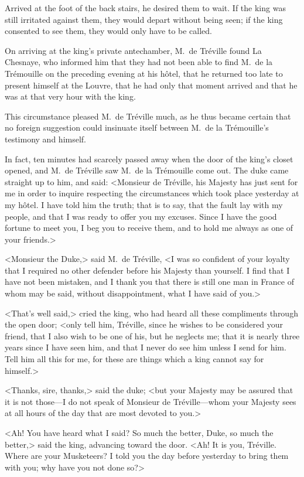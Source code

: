 Arrived at the foot of the back stairs, he desired them to wait. If the king was still irritated against them, they would depart without being seen; if the king consented to see them, they would only have to be called. 

On arriving at the king's private antechamber, M.~de Tréville found La Chesnaye, who informed him that they had not been able to find M.~de la Trémouille on the preceding evening at his hôtel, that he returned too late to present himself at the Louvre, that he had only that moment arrived and that he was at that very hour with the king. 

This circumstance pleased M.~de Tréville much, as he thus became certain that no foreign suggestion could insinuate itself between M.~de la Trémouille's testimony and himself. 

In fact, ten minutes had scarcely passed away when the door of the king's closet opened, and M.~de Tréville saw M.~de la Trémouille come out. The duke came straight up to him, and said: <Monsieur de Tréville, his Majesty has just sent for me in order to inquire respecting the circumstances which took place yesterday at my hôtel. I have told him the truth; that is to say, that the fault lay with my people, and that I was ready to offer you my excuses. Since I have the good fortune to meet you, I beg you to receive them, and to hold me always as one of your friends.> 

<Monsieur the Duke,> said M.~de Tréville, <I was so confident of your loyalty that I required no other defender before his Majesty than yourself. I find that I have not been mistaken, and I thank you that there is still one man in France of whom may be said, without disappointment, what I have said of you.> 

<That's well said,> cried the king, who had heard all these compliments through the open door; <only tell him, Tréville, since he wishes to be considered your friend, that I also wish to be one of his, but he neglects me; that it is nearly three years since I have seen him, and that I never do see him unless I send for him. Tell him all this for me, for these are things which a king cannot say for himself.> 

<Thanks, sire, thanks,> said the duke; <but your Majesty may be assured that it is not those—I do not speak of Monsieur de Tréville—whom your Majesty sees at all hours of the day that are most devoted to you.> 

<Ah! You have heard what I said? So much the better, Duke, so much the better,> said the king, advancing toward the door. <Ah! It is you, Tréville. Where are your Musketeers? I told you the day before yesterday to bring them with you; why have you not done so?> 

